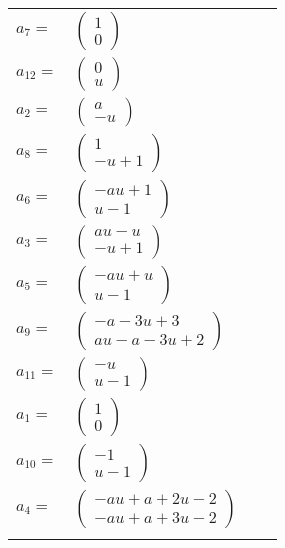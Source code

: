 \documentclass[1p]{elsarticle_modified}
\theoremstyle{definition}
\begin{document}
\begin{tabular}{m{7pt} m{180pt} m{7pt} m{180pt} }
\flushright $a_{7}=$&$\begin{pmatrix}1\\0\end{pmatrix}$ \\
\flushright $a_{12}=$&$\begin{pmatrix}0\\u\end{pmatrix}$ \\
\flushright $a_{2}=$&$\begin{pmatrix}a\\- u\end{pmatrix}$ \\
\flushright $a_{8}=$&$\begin{pmatrix}1\\- u+1\end{pmatrix}$ \\
\flushright $a_{6}=$&$\begin{pmatrix}- a u+1\\u-1\end{pmatrix}$ \\
\flushright $a_{3}=$&$\begin{pmatrix}a u- u\\- u+1\end{pmatrix}$ \\
\flushright $a_{5}=$&$\begin{pmatrix}- a u+u\\u-1\end{pmatrix}$ \\
\flushright $a_{9}=$&$\begin{pmatrix}- a-3 u+3\\a u- a-3 u+2\end{pmatrix}$ \\
\flushright $a_{11}=$&$\begin{pmatrix}- u\\u-1\end{pmatrix}$ \\
\flushright $a_{1}=$&$\begin{pmatrix}1\\0\end{pmatrix}$ \\
\flushright $a_{10}=$&$\begin{pmatrix}-1\\u-1\end{pmatrix}$ \\
\flushright $a_{4}=$&$\begin{pmatrix}- a u+a+2 u-2\\- a u+a+3 u-2\end{pmatrix}$\\&\end{tabular}
\end{document}
